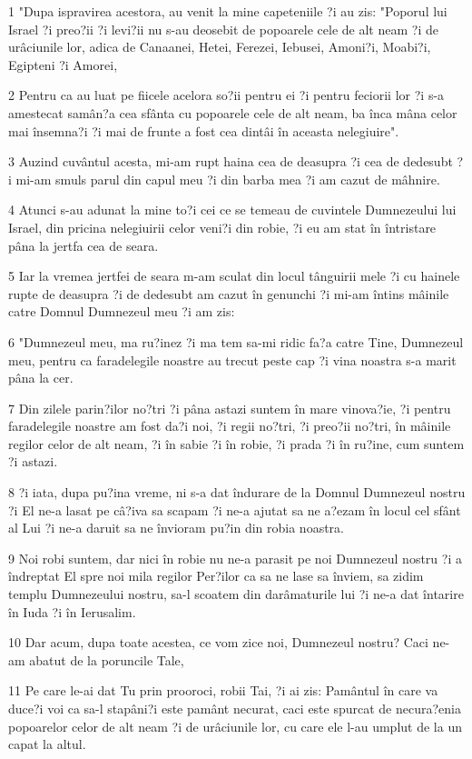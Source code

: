 \par 1 "Dupa ispravirea acestora, au venit la mine capeteniile ?i au zis: "Poporul lui Israel ?i preo?ii ?i levi?ii nu s-au deosebit de popoarele cele de alt neam ?i de urâciunile lor, adica de Canaanei, Hetei, Ferezei, Iebusei, Amoni?i, Moabi?i, Egipteni ?i Amorei,
\par 2 Pentru ca au luat pe fiicele acelora so?ii pentru ei ?i pentru feciorii lor ?i s-a amestecat samân?a cea sfânta cu popoarele cele de alt neam, ba înca mâna celor mai însemna?i ?i mai de frunte a fost cea dintâi în aceasta nelegiuire".
\par 3 Auzind cuvântul acesta, mi-am rupt haina cea de deasupra ?i cea de dedesubt ?i mi-am smuls parul din capul meu ?i din barba mea ?i am cazut de mâhnire.
\par 4 Atunci s-au adunat la mine to?i cei ce se temeau de cuvintele Dumnezeului lui Israel, din pricina nelegiuirii celor veni?i din robie, ?i eu am stat în întristare pâna la jertfa cea de seara.
\par 5 Iar la vremea jertfei de seara m-am sculat din locul tânguirii mele ?i cu hainele rupte de deasupra ?i de dedesubt am cazut în genunchi ?i mi-am întins mâinile catre Domnul Dumnezeul meu ?i am zis:
\par 6 "Dumnezeul meu, ma ru?inez ?i ma tem sa-mi ridic fa?a catre Tine, Dumnezeul meu, pentru ca faradelegile noastre au trecut peste cap ?i vina noastra s-a marit pâna la cer.
\par 7 Din zilele parin?ilor no?tri ?i pâna astazi suntem în mare vinova?ie, ?i pentru faradelegile noastre am fost da?i noi, ?i regii no?tri, ?i preo?ii no?tri, în mâinile regilor celor de alt neam, ?i în sabie ?i în robie, ?i prada ?i în ru?ine, cum suntem ?i astazi.
\par 8 ?i iata, dupa pu?ina vreme, ni s-a dat îndurare de la Domnul Dumnezeul nostru ?i El ne-a lasat pe câ?iva sa scapam ?i ne-a ajutat sa ne a?ezam în locul cel sfânt al Lui ?i ne-a daruit sa ne învioram pu?in din robia noastra.
\par 9 Noi robi suntem, dar nici în robie nu ne-a parasit pe noi Dumnezeul nostru ?i a îndreptat El spre noi mila regilor Per?ilor ca sa ne lase sa înviem, sa zidim templu Dumnezeului nostru, sa-l scoatem din darâmaturile lui ?i ne-a dat întarire în Iuda ?i în Ierusalim.
\par 10 Dar acum, dupa toate acestea, ce vom zice noi, Dumnezeul nostru? Caci ne-am abatut de la poruncile Tale,
\par 11 Pe care le-ai dat Tu prin prooroci, robii Tai, ?i ai zis: Pamântul în care va duce?i voi ca sa-l stapâni?i este pamânt necurat, caci este spurcat de necura?enia popoarelor celor de alt neam ?i de urâciunile lor, cu care ele l-au umplut de la un capat la altul.
